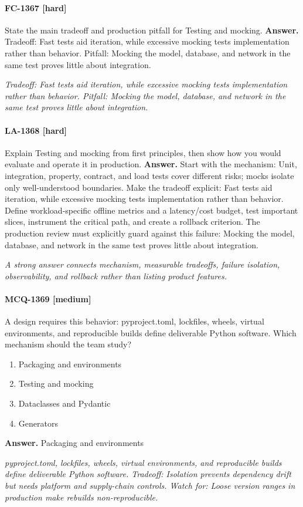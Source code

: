 \paragraph{FC-1367 [hard]} State the main tradeoff and production pitfall for Testing and mocking.
\noindent\textbf{Answer.} Tradeoff: Fast tests aid iteration, while excessive mocking tests implementation rather than behavior. Pitfall: Mocking the model, database, and network in the same test proves little about integration.
\par\textit{Tradeoff: Fast tests aid iteration, while excessive mocking tests implementation rather than behavior. Pitfall: Mocking the model, database, and network in the same test proves little about integration.}
\paragraph{LA-1368 [hard]} Explain Testing and mocking from first principles, then show how you would evaluate and operate it in production.
\noindent\textbf{Answer.} Start with the mechanism: Unit, integration, property, contract, and load tests cover different risks; mocks isolate only well-understood boundaries. Make the tradeoff explicit: Fast tests aid iteration, while excessive mocking tests implementation rather than behavior. Define workload-specific offline metrics and a latency/cost budget, test important slices, instrument the critical path, and create a rollback criterion. The production review must explicitly guard against this failure: Mocking the model, database, and network in the same test proves little about integration.
\par\textit{A strong answer connects mechanism, measurable tradeoffs, failure isolation, observability, and rollback rather than listing product features.}
\paragraph{MCQ-1369 [medium]} A design requires this behavior: pyproject.toml, lockfiles, wheels, virtual environments, and reproducible builds define deliverable Python software. Which mechanism should the team study?
\begin{enumerate}[label=\Alph*.]
\item Packaging and environments
\item Testing and mocking
\item Dataclasses and Pydantic
\item Generators
\end{enumerate}
\noindent\textbf{Answer.} Packaging and environments
\par\textit{pyproject.toml, lockfiles, wheels, virtual environments, and reproducible builds define deliverable Python software. Tradeoff: Isolation prevents dependency drift but needs platform and supply-chain controls. Watch for: Loose version ranges in production make rebuilds non-reproducible.}
